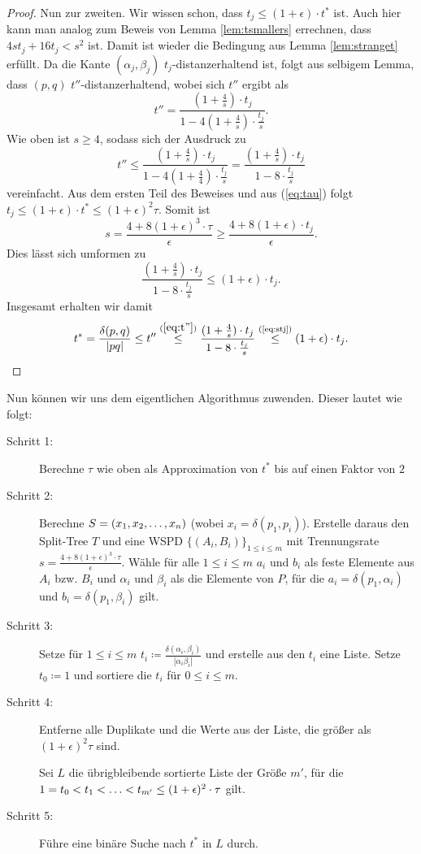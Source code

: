 \begin{proof}
	Nun zur zweiten. 
	Wir wissen schon, dass $t_j \leq (1 + \epsilon) \cdot t^*$ ist.
	Auch hier kann man analog zum Beweis von Lemma \ref{lem:tsmallers} errechnen, dass $4st_j + 16t_j < s^2$ ist. Damit ist wieder die Bedingung aus Lemma \ref{lem:stranget} erfüllt. Da die Kante $(\alpha_j, \beta_j)$ $t_j$-distanzerhaltend ist, folgt aus selbigem Lemma, dass $(p, q)$ $t''$-distanzerhaltend, wobei sich $t''$ ergibt als
	\[
	t'' = \frac{(1 + \frac{4}{s})\cdot t_j}{1 - 4 (1 + \frac{4}{s}) \cdot \frac{t_j}{s}}.
	\]
	Wie oben ist $s \geq 4$, sodass sich der Ausdruck zu 
	\[
	\label{eq:t''}
	t'' \leq \frac{(1 + \frac{4}{s})\cdot t_j}{1 - 4 (1 + \frac{4}{4}) \cdot \frac{t_j}{s}}
	= \frac{(1 + \frac{4}{s})\cdot t_j}{1 - 8 \cdot \frac{t_j}{s}} \tag{3}
	\]
	vereinfacht.
	Aus dem ersten Teil des Beweises und aus (\ref{eq:tau}) folgt $t_j \leq (1 + \epsilon) \cdot t^* \leq (1 + \epsilon)^2 \tau$. Somit ist
	\[
	s = \frac{4 + 8(1 + \epsilon)^3 \cdot \tau}{\epsilon} 
	\geq \frac{4 + 8 (1 + \epsilon) \cdot t_j}{\epsilon}. 
	\]
	Dies lässt sich umformen zu  
	\[
	\label{eq:stj}
	\frac{(1 + \frac{4}{s})\cdot t_j}{1 - 8 \cdot \frac{t_j}{s}} \leq (1 + \epsilon) \cdot t_j. \tag{4}
	\]
	Insgesamt erhalten wir damit \[
		t^* = \frac{\delta(p, q)}{|pq|} 
		\leq t''
		\stackrel{(\ref{eq:t''})}{\leq} \frac{(1 + \frac{4}{s})\cdot t_j}{1 - 8 \cdot \frac{t_j}{s}}
		\stackrel{\text{(\ref{eq:stj})}}{\leq} (1 + \epsilon)\cdot t_j.
	\]
\end{proof}

Nun können wir uns dem eigentlichen Algorithmus zuwenden. Dieser lautet wie folgt:

\begin{description}
	\item[Schritt 1:] Berechne $\tau$ wie oben als Approximation von $t^*$ bis auf einen Faktor von $2$
	
	\item[Schritt 2:] Berechne $S = (x_1, x_2, \mathellipsis, x_n)$ (wobei $x_i = \delta(p_1, p_i)$). 
	Erstelle daraus den Split-Tree $T$ und eine WSPD $\{(A_i, B_i)\}_{1 \leq i \leq m}$ mit Trennungsrate $s = \frac{4 + 8(1 + \epsilon)^3 \cdot \tau}{\epsilon}$. 
	Wähle für alle $1 \leq i \leq m$ $a_i$ und $b_i$ als feste Elemente aus $A_i$ bzw. $B_i$ und $\alpha_i$ und $\beta_i$ als die Elemente von $P$, für die $a_i = \delta(p_1, \alpha_i)$ und $b_i = \delta(p_1, \beta_i)$ gilt.
	
	\item[Schritt 3:] Setze für $1 \leq i \leq m$ $t_i \coloneqq \frac{\delta(\alpha_i, \beta_i)}{|\alpha_i \beta_i|}$ und erstelle aus den $t_i$ eine Liste. Setze $t_0 \coloneqq 1$ und sortiere die $t_i$ für $0 \leq i \leq m$.
	
	\item[Schritt 4:] Entferne alle Duplikate und die Werte aus der Liste, die größer als $(1 + \epsilon)^2 \tau$ sind.
	
	Sei $L$ die übrigbleibende sortierte Liste der Größe $m'$, für die $1 = t_0 < t_1 < \mathellipsis < t_{m'} \leq (1 + \epsilon)^2\cdot \tau$ gilt.
	
	\item[Schritt 5:] Führe eine binäre Suche nach $t^*$ in $L$ durch.
\end{description}

